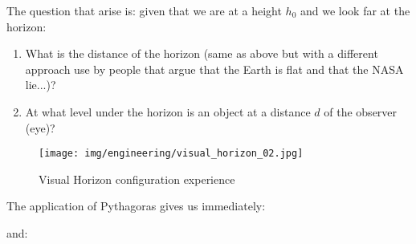 	The question that arise is: given that we are at a height $h_0$ and we look far at the horizon:
	\begin{enumerate}
		\item What is the distance of the horizon (same as above but with a different approach use by people that argue that the Earth is flat and that the NASA lie...)?

		\item At what level under the horizon is an object at a distance $d$ of the observer (eye)?
	\end{enumerate}
	\begin{figure}[H]
		\begin{center}
			\texttt{[image: img/engineering/visual\_horizon\_02.jpg]}
			\caption{Visual Horizon configuration experience}
		\end{center}	
	\end{figure}
	The application of Pythagoras gives us immediately:
	
	and:
	
